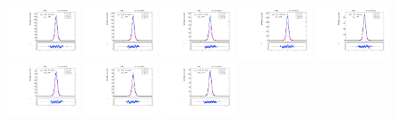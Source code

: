 \begin{figure}[htb]
\includegraphics[width=0.19\textwidth]{plots/Appendix_Recoil_Fits/ZmmMC_PF_5TeV_2G/pfu2fit_16.pdf}
\includegraphics[width=0.19\textwidth]{plots/Appendix_Recoil_Fits/ZmmMC_PF_5TeV_2G/pfu2fit_17.pdf}
\includegraphics[width=0.19\textwidth]{plots/Appendix_Recoil_Fits/ZmmMC_PF_5TeV_2G/pfu2fit_18.pdf}
\includegraphics[width=0.19\textwidth]{plots/Appendix_Recoil_Fits/ZmmMC_PF_5TeV_2G/pfu2fit_19.pdf}
\includegraphics[width=0.19\textwidth]{plots/Appendix_Recoil_Fits/ZmmMC_PF_5TeV_2G/pfu2fit_20.pdf}
\includegraphics[width=0.19\textwidth]{plots/Appendix_Recoil_Fits/ZmmMC_PF_5TeV_2G/pfu2fit_21.pdf}
\includegraphics[width=0.19\textwidth]{plots/Appendix_Recoil_Fits/ZmmMC_PF_5TeV_2G/pfu2fit_22.pdf}
\includegraphics[width=0.19\textwidth]{plots/Appendix_Recoil_Fits/ZmmMC_PF_5TeV_2G/pfu2fit_23.pdf}

\end{figure}
